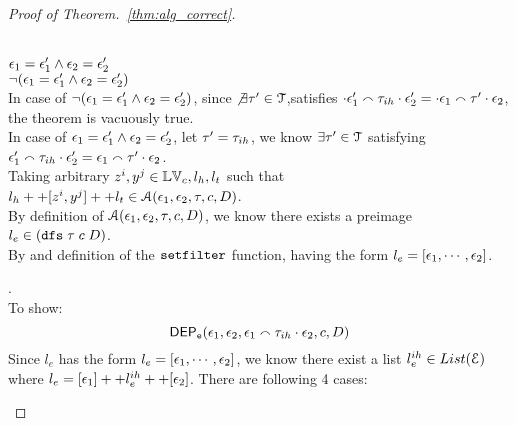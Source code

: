 \begin{proof}[Proof of Theorem.~\ref{thm:alg_correct}]
\begin{case}
\\
$\mathtt{\epsilon}_1 = \mathtt{\epsilon}_1' \land  \mathtt{\epsilon}_2 = \mathtt{\epsilon}_2'$
\\
$\neg(\mathtt{\epsilon}_1 = \mathtt{\epsilon}_1' \land  \mathtt{\epsilon}_2 = \mathtt{\epsilon}_2')$
\\
In case of $\neg(\mathtt{\epsilon}_1 = \mathtt{\epsilon}_1' \land  \mathtt{\epsilon}_2 = \mathtt{\epsilon}_2')$, since 
$\not\exists \mathtt{\tau}' \in \mathcal{T}$,satisfies $
\cdot {} \mathtt{\epsilon}_1' {}\smallfrown \mathtt{\tau}_{ih} \cdot {} \mathtt{\epsilon}_2'  = \cdot {} \mathtt{\epsilon}_1 \smallfrown \mathtt{\tau}' \cdot \mathtt{\epsilon}_2$, 
the theorem is vacuously true.
\\
%
In case of $\mathtt{\epsilon}_1 = \mathtt{\epsilon}_1' \land  \mathtt{\epsilon}_2 = \mathtt{\epsilon}_2'$,
let $\mathtt{\tau}' = \mathtt{\tau}_{ih}$, we know $\exists \mathtt{\tau}' \in \mathcal{T}$ satisfying 
$\mathtt{\epsilon}_1'  {}\smallfrown \mathtt{\tau}_{ih} \cdot {} \mathtt{\epsilon}_2' = \mathtt{\epsilon}_1 \smallfrown \mathtt{\tau}' \cdot \mathtt{\epsilon}_2$.
\\
Taking arbitrary $z^i, y^j \in \mathbb{LV}_c, l_h, l_t$ such that 
$l_h ++ [z^i, y^j] ++ l_t \in \mathcal{A}(\mathtt{\epsilon}_1, \mathtt{\epsilon}_2, \mathtt{\tau}, c, D)$.
\\
By definition of $\mathcal{A}(\mathtt{\epsilon}_1, \mathtt{\epsilon}_2, \mathtt{\tau}, c, D)$,
we know there exists a preimage $l_e \in (\mathtt{dfs} \; \mathtt{\tau} \; c \;  D )$.
\\
By and definition of the 
$\mathtt{setfilter}$ function,
having the form $l_e = [\mathtt{\epsilon}_1, \cdots, \mathtt{\epsilon}_2]$. 
\\
\begin{subproof}.
  \\
  To show:
\[  
\mathsf{DEP_{\mathtt{e}}}(\mathtt{\epsilon}_1, \mathtt{\epsilon}_2, \mathtt{\epsilon}_1 \smallfrown \mathtt{\tau}_{ih} \cdot \mathtt{\epsilon}_2, {c}, D) 
\]
Since $l_e$ has the form $l_e = [\mathtt{\epsilon}_1, \cdots, \mathtt{\epsilon}_2] $, 
we know there exist a list $l^{ih}_e \in List(\mathcal{E})$
where $l_e = [\mathtt{\epsilon}_1] ++ l^{ih}_e ++ [\mathtt{\epsilon}_2]$.
There are following 4 cases:


\end{subproof}
\end{case}
\end{proof}
